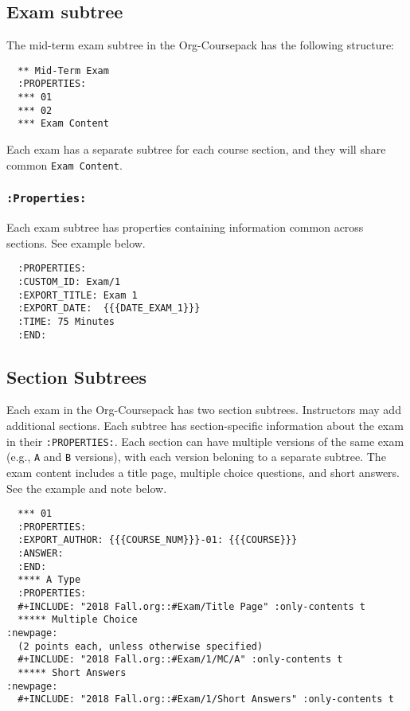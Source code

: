 \documentclass[10pt,article]{article}
\begin{document}
\subsection{Exam subtree}
\label{sec:orgf4e3a42}
The mid-term exam subtree in the Org-Coursepack has the following structure:

\begin{verbatim}
  ** Mid-Term Exam
  :PROPERTIES:
  *** 01
  *** 02
  *** Exam Content
\end{verbatim}

Each exam has a separate subtree for each course section, and they will
share common \texttt{Exam Content}.
\subsubsection{\texttt{:Properties:}}
\label{sec:orga1d4f7f}
Each exam subtree has properties containing information common across sections. See example below.
\begin{verbatim}
  :PROPERTIES:
  :CUSTOM_ID: Exam/1
  :EXPORT_TITLE: Exam 1
  :EXPORT_DATE:  {{{DATE_EXAM_1}}}
  :TIME: 75 Minutes
  :END:
\end{verbatim}
\subsection{Section Subtrees}
\label{sec:orgc23950f}
Each exam in the Org-Coursepack has two section subtrees. Instructors
may add additional sections. Each subtree has section-specific
information about the exam in their \texttt{:PROPERTIES:}. Each section can
have multiple versions of the same exam (e.g., \texttt{A} and \texttt{B} versions),
with each version beloning to a separate subtree. The exam content
includes a title page, multiple choice questions, and short
answers. See the example and note below.

{\small
\begin{verbatim}
  *** 01
  :PROPERTIES:
  :EXPORT_AUTHOR: {{{COURSE_NUM}}}-01: {{{COURSE}}}
  :ANSWER:
  :END:
  **** A Type
  :PROPERTIES:
  #+INCLUDE: "2018 Fall.org::#Exam/Title Page" :only-contents t
  ***** Multiple Choice                                               :newpage:
  (2 points each, unless otherwise specified)
  #+INCLUDE: "2018 Fall.org::#Exam/1/MC/A" :only-contents t
  ***** Short Answers                                                 :newpage:
  #+INCLUDE: "2018 Fall.org::#Exam/1/Short Answers" :only-contents t
\end{verbatim}
}
\end{document}
